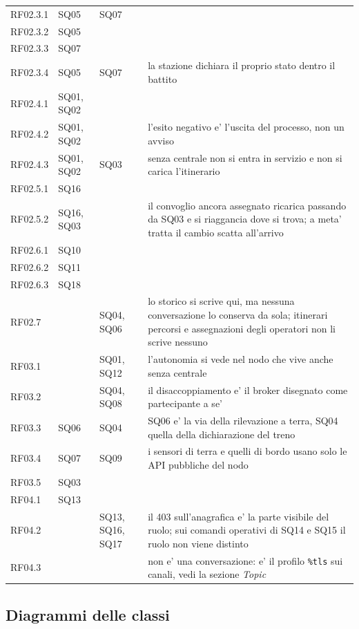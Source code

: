 \documentclass[11pt]{article}
\begin{document}
{\begin{longtable}{L{0.13\textwidth}L{0.13\textwidth}L{0.13\textwidth}L{0.48\textwidth}}
RF02.3.1 & SQ05 & SQ07 & \\
RF02.3.2 & SQ05 &  & \\
RF02.3.3 & SQ07 &  & \\
RF02.3.4 & SQ05 & SQ07 & la stazione dichiara il proprio stato dentro il battito\\
RF02.4.1 & SQ01, SQ02 &  & \\
RF02.4.2 & SQ01, SQ02 &  & l'esito negativo e' l'uscita del processo, non un avviso\\
RF02.4.3 & SQ01, SQ02 & SQ03 & senza centrale non si entra in servizio e non si carica l'itinerario\\
RF02.5.1 & SQ16 &  & \\
RF02.5.2 & SQ16, SQ03 &  & il convoglio ancora assegnato ricarica passando da SQ03 e si riaggancia dove si trova; a meta' tratta il cambio scatta all'arrivo\\
RF02.6.1 & SQ10 &  & \\
RF02.6.2 & SQ11 &  & \\
RF02.6.3 & SQ18 &  & \\
RF02.7 &  & SQ04, SQ06 & lo storico si scrive qui, ma nessuna conversazione lo conserva da sola; itinerari percorsi e assegnazioni degli operatori non li scrive nessuno\\
RF03.1 &  & SQ01, SQ12 & l'autonomia si vede nel nodo che vive anche senza centrale\\
RF03.2 &  & SQ04, SQ08 & il disaccoppiamento e' il broker disegnato come partecipante a se'\\
RF03.3 & SQ06 & SQ04 & SQ06 e' la via della rilevazione a terra, SQ04 quella della dichiarazione del treno\\
RF03.4 & SQ07 & SQ09 & i sensori di terra e quelli di bordo usano solo le API pubbliche del nodo\\
RF03.5 & SQ03 &  & \\
RF04.1 & SQ13 &  & \\
RF04.2 &  & SQ13, SQ16, SQ17 & il 403 sull'anagrafica e' la parte visibile del ruolo; sui comandi operativi di SQ14 e SQ15 il ruolo non viene distinto\\
RF04.3 &  &  & non e' una conversazione: e' il profilo \texttt{\%tls} sui canali, vedi la sezione \emph{Topic}\\
\end{longtable}}
\subsection{Diagrammi delle classi}
\label{sec:orge72da63}
\end{document}
